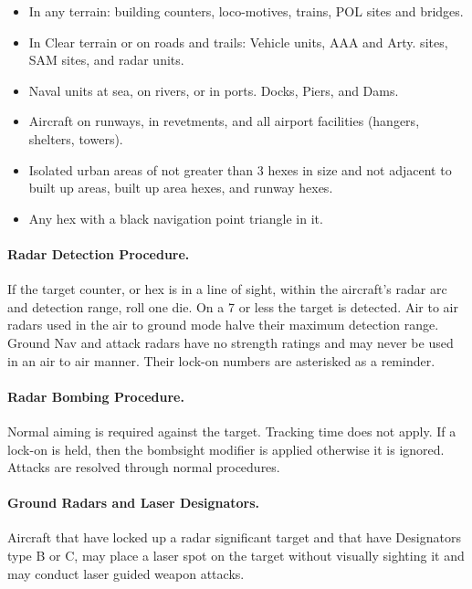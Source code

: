 \begin{itemize}

    \item In any terrain: building counters, loco-motives, trains, POL sites and bridges.

    \item In Clear terrain or on roads and trails: Vehicle units, AAA and Arty. sites, SAM sites, and radar units.

    \item Naval units at sea, on rivers, or in ports. Docks, Piers, and Dams.

    \item Aircraft on runways, in revetments, and all airport facilities (hangers, shelters, towers).

    \item Isolated urban areas of not greater than 3 hexes in size and not adjacent to built up areas, built up area hexes, and runway hexes.
    
    \item Any hex with a black navigation point triangle in it.

\end{itemize}

\paragraph{Radar Detection Procedure.} If the target counter, or hex is in a line of sight, within the aircraft's radar arc and detection range, roll one die. On a 7 or less the target is detected. Air to air radars used in the air to ground mode halve their maximum detection range. Ground Nav and attack radars have no strength ratings and may never be used in an air to air manner. Their lock-on numbers are asterisked as a reminder.

\paragraph{Radar Bombing Procedure.} Normal aiming is required against the target. Tracking time does not apply. If a lock-on is held, then the bombsight modifier is applied otherwise it is ignored. Attacks are resolved through normal procedures.

\paragraph{Ground Radars and Laser Designators.} Aircraft that have locked up a radar significant target and that have Designators type B or C, may place a laser spot on the target without visually sighting it and may conduct laser guided weapon attacks.

